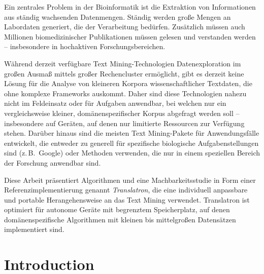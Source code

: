 \documentclass[a4paper, 12pt, twoside, reqn]{report}
\numberwithin{figure}{chapter}
\newenvironment{abstractpage}
  {\cleardoublepage\vspace*{\fill}\thispagestyle{empty}}
  {\vfill\cleardoublepage}
\renewenvironment{abstract}[1]
  {\bigskip\selectlanguage{#1}%
   \begin{center}\bfseries\abstractname\end{center}}
  {\par\bigskip}
\newtheorem[L]{boxedDefinition}{Definition}
\newtheorem[L]{boxedExample}{Example}
\newcommand{\zB}{z.\,B.\ }
\begin{document}
\begin{abstractpage}

\begin{abstract}{german}

Ein zentrales Problem in der Bioinformatik ist die Extraktion von Informationen aus ständig wachsenden Datenmengen. Ständig werden große Mengen an Labordaten generiert, die der Verarbeitung bedürfen. Zusätzlich müssen auch Millionen biomedizinischer Publikationen müssen gelesen und verstanden werden -- insbesondere in hochaktiven Forschungsbereichen.

Während derzeit verfügbare Text Mining-Technologien Datenexploration im großen Ausmaß mittels großer Rechencluster ermöglicht, gibt es derzeit keine Lösung für die Analyse von kleineren Korpora wissenschaftlicher Textdaten, die ohne komplexe Frameworks auskommt.
Daher sind diese Technologien nahezu nicht im Feldeinsatz oder für Aufgaben anwendbar, bei welchen nur ein vergleichsweise kleiner, domänenspezifischer Korpus abgefragt werden soll -- insbesondere auf Geräten, auf denen nur limitierte Ressourcen zur Verfügung stehen.
Darüber hinaus sind die meisten Text Mining-Pakete für Anwendungsfälle entwickelt, die entweder zu generell für spezifische biologische Aufgabenstellungen sind (\zB Google) oder Methoden verwenden, die nur in einem speziellen Bereich der Forschung anwendbar sind.

Diese Arbeit präsentiert Algorithmen und eine Machbarkeitsstudie in Form einer Referenzimplementierung genannt \textit{\glqq Translatron\grqq}, die eine individuell anpassbare und portable Herangehensweise an das Text Mining verwendet. Translatron ist optimiert für autonome Geräte mit begrenztem Speicherplatz, auf denen domänenspezifische Algorithmen mit kleinen bis mittelgroßen Datensätzen implementiert sind.
\vfill
\end{abstract}
\end{abstractpage}


{\small\tableofcontents}
\newpage
\thispagestyle{empty}
\textbf{ }
\newpage
{}
\pagestyle{fancy}
\chapter{Introduction}\label{chapter:introduction}
\end{document}
